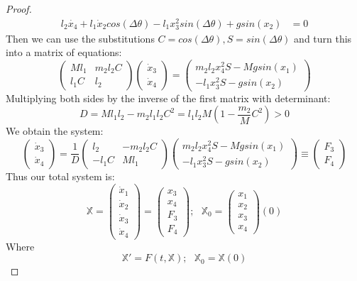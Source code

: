 \documentclass[12pt]{article}
\begin{document}
\begin{proof}
\begin{align*}
l_2\dot{x_4} + l_1\dot{x}_2 cos(\Delta \theta) - l_1x_3^2sin(\Delta \theta) + gsin(x_2) &= 0
\end{align*}
Then we can use the substitutions $C = cos(\Delta \theta), S = sin(\Delta \theta)$ and turn this into a matrix of equations:
\[ \left( \begin{array}{cc}
Ml_1 & m_2l_2C \\
l_1C & l_2
\end{array} \right)
%
\left( \begin{array}{c}
\dot{x}_3  \\
\dot{x}_4 
\end{array} \right)
=
\left( \begin{array}{c}
m_2l_2x_4^2S-Mgsin(x_1) \\
-l_1x_3^2S-gsin(x_2)
\end{array} \right)
\]
Multiplying both sides by the inverse of the first matrix with determinant:
\[D = Ml_1l_2 - m_2l_1l_2C^2  = l_1l_2M(1-\dfrac{m_2}{M}C^2) > 0\]
We obtain the system: 
\[\left( \begin{array}{c}
\dot{x}_3  \\
\dot{x}_4 
\end{array} \right)
=
\dfrac{1}{D}
\left( \begin{array}{cc}
l_2 & -m_2l_2C  \\
-l_1C & Ml_1
\end{array} \right)
\left( \begin{array}{c}
m_2l_2x_4^2S-Mgsin(x_1) \\
-l_1x_3^2S-gsin(x_2)
\end{array} \right)
\equiv
\left( \begin{array}{c}
F_3 \\
F_4
\end{array} \right)
\]
Thus our total system is:
\[
\mathbb{X} = 
\left( \begin{array}{c}
\dot{x}_1 \\
\dot{x}_2 \\
\dot{x}_3 \\
\dot{x}_4
\end{array} \right)
=
\left( \begin{array}{c}
x_3 \\
x_4 \\
F_3 \\
F_4
\end{array} \right)
; \textbf{  }
\mathbb{X}_0 = 
\left( \begin{array}{c}
x_1 \\
x_2 \\
x_3 \\
x_4
\end{array} \right)
(0)
\]
Where 
\[\mathbb{X}' = F(t,\mathbb{X}); \textbf{ } \mathbb{X}_0 = \mathbb{X}(0) \]




\end{proof}
\end{document}
